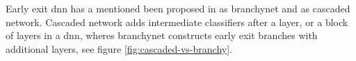 Early exit \gls{dnn} has a mentioned been proposed in  \cite{teerapittayanon_branchynet:_2016} as \gls{branchynet} and  \cite{leroux_resource-constrained_2015} as cascaded network. Cascaded network adds intermediate classifiers after a layer, or a block of layers in a \gls{dnn}, wheres \gls{branchynet} constructs early exit branches with additional layers, see figure \ref{fig:cascaded-vs-branchy}.

\begin{figure}
	\centering
	\hspace{2em}

\end{figure}
